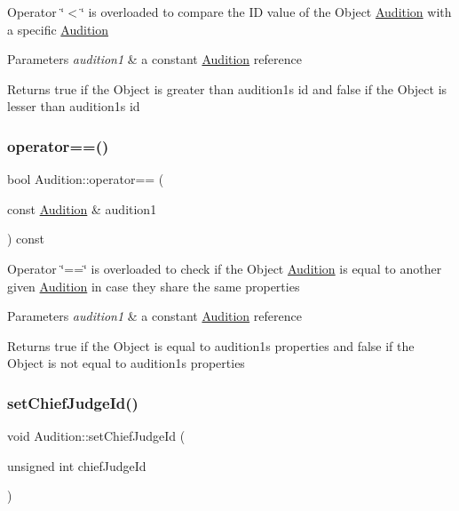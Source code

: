 Operator \char`\"{}$<$\char`\"{} is overloaded to compare the ID value of the Object \hyperlink{class_audition}{Audition} with a specific \hyperlink{class_audition}{Audition} 
\begin{DoxyParams}{Parameters}
{\em audition1} & a constant \hyperlink{class_audition}{Audition} reference \\
\hline
\end{DoxyParams}
\begin{DoxyReturn}{Returns}
true if the Object is greater than audition1\textquotesingle{}s id and false if the Object is lesser than audition1\textquotesingle{}s id 
\end{DoxyReturn}
\mbox{\label{class_audition_ac0cb2b6e7de7fd30691bbea60640bd2a}} 
\subsubsection{\texorpdfstring{operator==()}{operator==()}}
{\footnotesize\ttfamily bool Audition\+::operator== (\begin{DoxyParamCaption}\item[{const \hyperlink{class_audition}{Audition} \&}]{audition1 }\end{DoxyParamCaption}) const}

Operator \char`\"{}==\char`\"{} is overloaded to check if the Object \hyperlink{class_audition}{Audition} is equal to another given \hyperlink{class_audition}{Audition} in case they share the same properties 
\begin{DoxyParams}{Parameters}
{\em audition1} & a constant \hyperlink{class_audition}{Audition} reference \\
\hline
\end{DoxyParams}
\begin{DoxyReturn}{Returns}
true if the Object is equal to audition1\textquotesingle{}s properties and false if the Object is not equal to audition1\textquotesingle{}s properties 
\end{DoxyReturn}
\mbox{\label{class_audition_a9a6e504bfa0ac383a13404a3a6544935}} 
\subsubsection{\texorpdfstring{set\+Chief\+Judge\+Id()}{setChiefJudgeId()}}
{\footnotesize\ttfamily void Audition\+::set\+Chief\+Judge\+Id (\begin{DoxyParamCaption}\item[{unsigned int}]{chief\+Judge\+Id }\end{DoxyParamCaption})}

